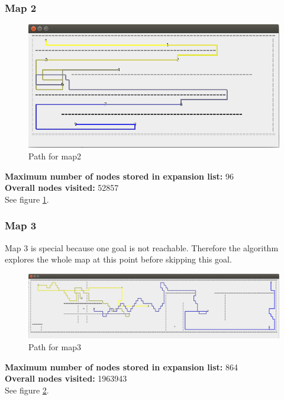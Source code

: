 \documentclass[paper=a4, fontsize=11pt]{scrartcl} %
\numberwithin{equation}{section} %
\numberwithin{figure}{section} %
\numberwithin{table}{section} %
\begin{document}
\subsubsection{Map 2}
\begin{figure}[Ht]
	\centering
  \includegraphics[width=1\textwidth]{images/map2.png}
	\caption{Path for map2}
	\label{fig:map2}
\end{figure}
\textbf{Maximum number of nodes stored in expansion list:} 96\\
\textbf{Overall nodes visited:} 52857\\
See figure \ref{fig:map2}.

\subsubsection{Map 3}
Map 3 is special because one goal is not reachable. Therefore the algorithm explores the whole map at this point before skipping this goal.\\

\begin{figure}[Ht]
	\centering
  \includegraphics[width=1\textwidth]{images/map3.png}
	\caption{Path for map3}
	\label{fig:map3}
\end{figure}
\textbf{Maximum number of nodes stored in expansion list:} 864\\
\textbf{Overall nodes visited:} 1963943\\
See figure \ref{fig:map3}.\\
\end{document}
